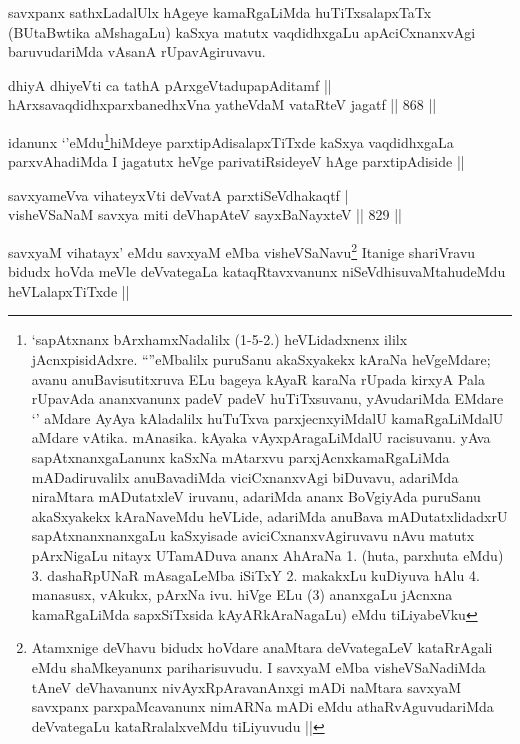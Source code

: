 \begin{artha}
savxpanx sathxLadalUlx hAgeye kamaRgaLiMda huTiTxsalapxTaTx (BUtaBwtika aMshagaLu) kaSxya matutx vaqdidhxgaLu apAciCxnanxvAgi baruvudariMda vAsanA rUpavAgiruvavu.
\end{artha}

\begin{shl}
dhiyA dhiyeVti ca tathA pArxgeVtadupapAditamf || \\
hArxsavaqdidhxparxbanedhxVna yatheVdaM vataRteV jagatf ||  868 ||  
\end{shl}

\begin{artha}
idanunx `\stext'eMdu\footnote{`sapAtxnanx bArxhamxNadalilx (1-5-2.) heVLidadxnenx ililx jAcnxpisidAdxre. ``\stext''eMbalilx puruSanu akaSxyakekx kAraNa heVgeMdare; avanu anuBavisutitxruva ELu bageya kAyaR karaNa rUpada kirxyA Pala rUpavAda ananxvanunx padeV padeV huTiTxsuvanu, yAvudariMda EMdare `\stext' aMdare AyAya kAladalilx huTuTxva parxjecnxyiMdalU kamaRgaLiMdalU aMdare vAtika. mAnasika. kAyaka vAyxpAragaLiMdalU racisuvanu. yAva sapAtxnanxgaLanunx kaSxNa mAtarxvu parxjAcnxkamaRgaLiMda mADadiruvalilx anuBavadiMda viciCxnanxvAgi biDuvavu, adariMda niraMtara mADutatxleV iruvanu, adariMda ananx BoVgiyAda puruSanu akaSxyakekx kAraNaveMdu heVLide, adariMda anuBava mADutatxlidadxrU sapAtxnanxnanxgaLu kaSxyisade aviciCxnanxvAgiruvavu nAvu matutx pArxNigaLu nitayx UTamADuva ananx AhAraNa 1. (huta, parxhuta eMdu) 3. dashaRpUNaR mAsagaLeMba iSiTxY 2. makakxLu kuDiyuva hAlu 4. manasusx, vAkukx, pArxNa ivu. hiVge ELu (3) ananxgaLu jAcnxna kamaRgaLiMda sapxSiTxsida kAyARkAraNagaLu) eMdu tiLiyabeVku}hiMdeye parxtipAdisalapxTiTxde kaSxya vaqdidhxgaLa parxvAhadiMda I jagatutx heVge parivatiRsideyeV hAge parxtipAdiside ||
\end{artha}

\begin{shl}
savxyameVva vihateyxVti deVvatA parxtiSeVdhakaqtf |\\
visheVSaNaM savxya miti deVhapAteV \s sayxBaNayxteV || 829 ||
\end{shl}



\begin{artha}
savxyaM vihatayx' eMdu savxyaM eMba visheVSaNavu\footnote{Atamxnige deVhavu bidudx hoVdare anaMtara deVvategaLeV kataRrAgali eMdu shaMkeyanunx pariharisuvudu. I savxyaM eMba visheVSaNadiMda tAneV deVhavanunx nivAyxRpAravanAnxgi mADi naMtara savxyaM savxpanx parxpaMcavanunx nimARNa mADi eMdu athaRvAguvudariMda deVvategaLu kataRralalxveMdu tiLiyuvudu ||} Itanige shariVravu bidudx hoVda meVle deVvategaLa kataqRtavxvanunx niSeVdhisuvaMtahudeMdu heVLalapxTiTxde ||
\end{artha}

